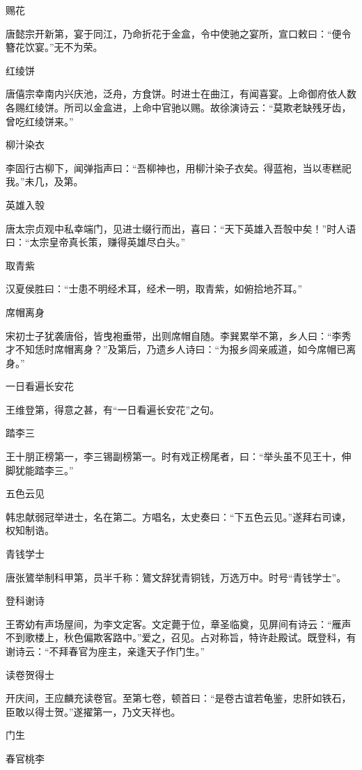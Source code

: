 \documentclass[a4paper,12pt,UTF8,twoside]{ctexbook}
\begin{document}
    赐花
    
    唐懿宗开新第，宴于同江，乃命折花于金盒，令中使驰之宴所，宣口敕曰：“便令簪花饮宴。”无不为荣。
    
    红绫饼
    
    唐僖宗幸南内兴庆池，泛舟，方食饼。时进士在曲江，有闻喜宴。上命御府依人数各赐红绫饼。所司以金盒进，上命中官驰以赐。故徐演诗云：“莫欺老缺残牙齿，曾吃红绫饼来。”
    
    柳汁染衣
    
    李固行古柳下，闻弹指声曰：“吾柳神也，用柳汁染子衣矣。得蓝袍，当以枣糕祀我。”未几，及第。
    
    英雄入彀
    
    唐太宗贞观中私幸端门，见进士缀行而出，喜曰：“天下英雄入吾彀中矣！”时人语曰：“太宗皇帝真长策，赚得英雄尽白头。”
    
    取青紫
    
    汉夏侯胜曰：“士患不明经术耳，经术一明，取青紫，如俯拾地芥耳。”
    
    席帽离身
    
    宋初士子犹袭唐俗，皆曳袍垂带，出则席帽自随。李巽累举不第，乡人曰：“李秀才不知恁时席帽离身？”及第后，乃遗乡人诗曰：“为报乡闾亲戚道，如今席帽已离身。”
    
    一日看遍长安花
    
    王维登第，得意之甚，有“一日看遍长安花”之句。
    
    踏李三
    
    王十朋正榜第一，李三锡副榜第一。时有戏正榜尾者，曰：“举头虽不见王十，伸脚犹能踏李三。”
    
    五色云见
    
    韩忠献弱冠举进士，名在第二。方唱名，太史奏曰：“下五色云见。”遂拜右司谏，权知制诰。
    
    青钱学士
    
    唐张鷟举制科甲第，员半千称：鷟文辞犹青铜钱，万选万中。时号“青钱学士”。
    
    登科谢诗
    
    王寄幼有声场屋间，为李文定客。文定薨于位，章圣临奠，见屏间有诗云：“雁声不到歌楼上，秋色偏欺客路中。”爱之，召见。占对称旨，特许赴殿试。既登科，有谢诗云：“不拜春官为座主，亲逢天子作门生。”
    
    读卷贺得士
    
    开庆间，王应麟充读卷官。至第七卷，顿首曰：“是卷古谊若龟鉴，忠肝如铁石，臣敢以得士贺。”遂擢第一，乃文天祥也。
    
    门生
    
    春官桃李
    
\end{document}
